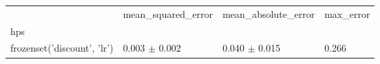 \begin{tabular}{llll}
\toprule
 & mean_squared_error & mean_absolute_error & max_error \\
hps &  &  &  \\
\midrule
frozenset({'discount', 'lr'}) & 0.003 $\pm$ 0.002 & 0.040 $\pm$ 0.015 & 0.266 \\
\bottomrule
\end{tabular}
